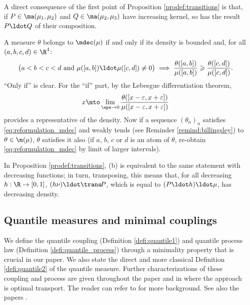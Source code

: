 \begin{rem}\label{rem:transitions_croissantes_composee} A direct consequence of the first point of Proposition \ref{prodef:transitions} is that, if $P\in\ma(\mu_1,\mu_2)$ and $Q\in\ma(\mu_2,\mu_3)$ have increasing kernel, so has the result $P\ldot Q$ of their composition.
\end{rem}

\begin{rem}\label{rem:mdec} A measure $\theta$ belongs to $\mdec(\mu)$ if and only if its density is bounded and, for all $(a,b,c,d)\in\R^4$:
\begin{equation}\label{eq:reformulation_mdec}
\bigl(a<b<c<d\ \text{and}\ \mu([a,b])\ldot\mu([c,d])\neq0\bigr)\implies \frac{\theta([a,b])}{\mu([a,b])}\geqslant \frac{\theta([c,d])}{\mu([c,d])}.
\end{equation}
``Only if'' is clear. For the ``if'' part, by the Lebesgue differentiation theorem,
\[
x\mto\lim_{\eps\to0}\frac{\theta([x-\varepsilon,x+\varepsilon])}{\mu([x-\varepsilon,x+\varepsilon])}
\]
provides a representative of the density. Now if a sequence $(\theta_n)_n$ satisfies \eqref{eq:reformulation_mdec} and weakly tends (see Reminder \ref{remind:billingsley}) to $\theta\in\m(\mu)$, $\theta$ satisfies it also (if $a$, $b$, $c$ or $d$ is an atom of $\theta$, re-obtain \eqref{eq:reformulation_mdec} by limit of larger intervals).
\end{rem}

\begin{rem}\label{rem:stable}
In Proposition \ref{prodef:transitions}, (b) is equivalent to the same statement with decreasing functions; in turn, transposing, this means that, for all decreasing $h:\R\to[0,1]$, $(h\nu)\ldot\trans\!P$, which is equal to $(P\ldot h)\ldot\mu$, has decreasing density.
\end{rem}

\subsection{Quantile measures and minimal couplings}\label{ss:minimality}
We define the quantile coupling (Definition \ref{defi:quantile1}) and quantile process law (Definition \ref{defi:quantile_process}) through a minimality property that is crucial in our paper. We also state the direct and more classical Definition \ref{defi:quantile2} of the quantile measure. Further characterizations of these coupling and process are given throughout the paper and in \cite{BouJui2} where the approach is optimal transport. The reader can refer to \cite{RR, Vi1} for more background. See also the papers \cite{Ju_seminaire, Pass}.

